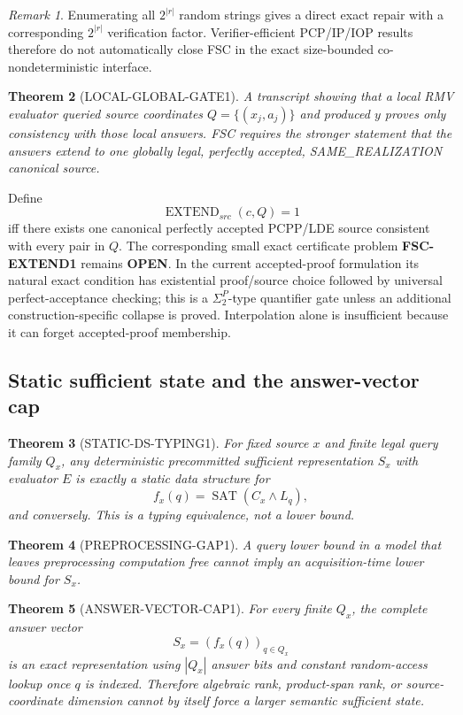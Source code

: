 \documentclass[11pt]{article}
\newcommand{\statusopen}{\textcolor{openstatus}{\textbf{OPEN}}}
\theoremstyle{plain}
\newtheorem{theorem}{Theorem}[section]
\theoremstyle{definition}
\theoremstyle{remark}
\newtheorem{remark}[theorem]{Remark}
\begin{document}
\begin{remark}
Enumerating all \(2^{|r|}\) random strings gives a direct exact repair with a
corresponding \(2^{|r|}\) verification factor. Verifier-efficient PCP/IP/IOP
results therefore do not automatically close FSC in the exact size-bounded
co-nondeterministic interface.
\end{remark}

\begin{theorem}[LOCAL-GLOBAL-GATE1]
A transcript showing that a local RMV evaluator queried source coordinates
\(Q=\{(x_j,a_j)\}\) and produced \(y\) proves only consistency with those
local answers. FSC requires the stronger statement that the answers extend to
one globally legal, perfectly accepted, SAME\_REALIZATION canonical source.
\end{theorem}

Define
\[
\operatorname{EXTEND}_{src}(c,Q)=1
\]
iff there exists one canonical perfectly accepted PCPP/LDE source consistent
with every pair in \(Q\). The corresponding small exact certificate problem
\textbf{FSC-EXTEND1} remains \statusopen. In the current accepted-proof
formulation its natural exact condition has existential proof/source choice
followed by universal perfect-acceptance checking; this is a
\(\Sigma_2^P\)-type quantifier gate unless an additional
construction-specific collapse is proved. Interpolation alone is insufficient
because it can forget accepted-proof membership.

\subsection{Static sufficient state and the answer-vector cap}

\begin{theorem}[STATIC-DS-TYPING1]
For fixed source \(x\) and finite legal query family \(Q_x\), any
deterministic precommitted sufficient representation \(S_x\) with evaluator
\(E\) is exactly a static data structure for
\[
f_x(q)=\operatorname{SAT}(C_x\wedge L_q),
\]
and conversely. This is a typing equivalence, not a lower bound.
\end{theorem}

\begin{theorem}[PREPROCESSING-GAP1]
A query lower bound in a model that leaves preprocessing computation free
cannot imply an acquisition-time lower bound for \(S_x\).
\end{theorem}

\begin{theorem}[ANSWER-VECTOR-CAP1]
For every finite \(Q_x\), the complete answer vector
\[
S_x=(f_x(q))_{q\in Q_x}
\]
is an exact representation using \(|Q_x|\) answer bits and constant
random-access lookup once \(q\) is indexed. Therefore algebraic rank,
product-span rank, or source-coordinate dimension cannot by itself force a
larger semantic sufficient state.
\end{theorem}
\end{document}
